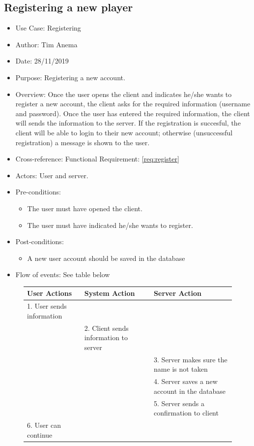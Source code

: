 \documentclass[10pt]{article}
\begin{document}
	\subsection{Registering a new player}
			\begin{itemize}
			\item{Use Case:} Registering
			\item{Author:} Tim Anema
			\item{Date:} 28/11/2019
			\item{Purpose:} Registering a new account.
			\item{Overview:} Once the user opens the client and indicates he/she wants to register a new account, the client asks for the required information (username and password).
			Once the user has entered the required information, the client will sends the information to the server. If the registration is succesful, the client will be able to login to their new account; otherwise (unsuccessful registration) a message is shown to the user.
			\item{Cross-reference:} Functional Requirement: \ref{req:register}
			\item{Actors:} User and server.
			\item{Pre-conditions:}
				\begin{itemize}
					\item The user must have opened the client.
					\item The user must have indicated he/she wants to register.
				\end{itemize}
			\item{Post-conditions:}
				\begin{itemize}
					\item A new user account should be saved in the database
				\end{itemize}
				\item{Flow of events:} See table below
			\end{itemize}
		\begin{figure}[H]
						\begin{tabular}{|p{45mm}|p{45mm}|p{45mm}}
User Actions                                  & System Action                                &
Server Action                                                              \\
\hline
1. User sends information & &  \\
& 2. Client sends information to server &  \\
& &   3. Server makes sure the name is not taken  \\
& &4. Server saves a new account in the database\\
& &5. Server sends a confirmation to client\\
6. User can continue  & & \\
			\end{tabular}
		\end{figure}
\end{document}
